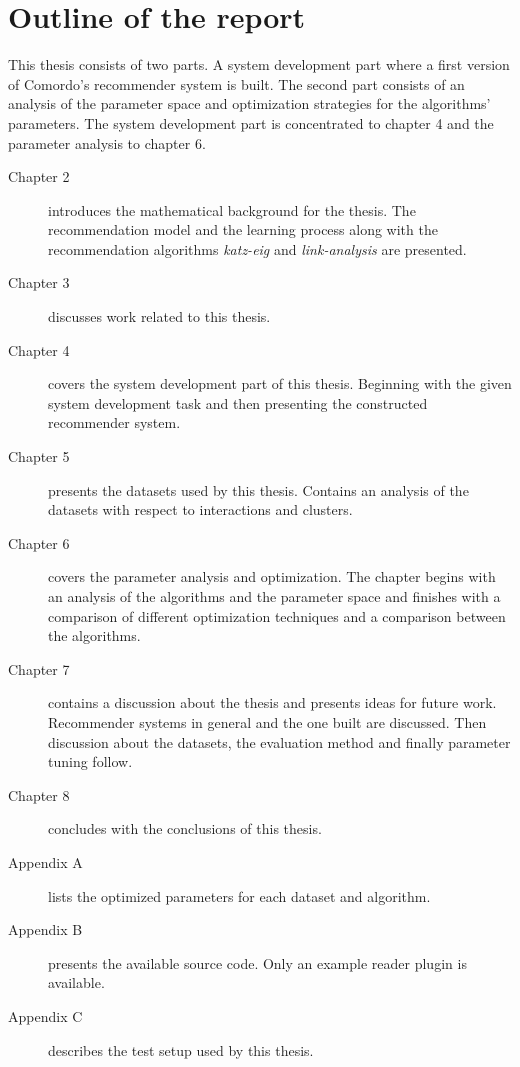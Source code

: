 
\section{Outline of the report}\label{sec:intro:outline}

This thesis consists of two parts. A system development part where a first version of Comordo's recommender system is built. The second part consists of an analysis of the parameter space and optimization strategies for the algorithms' parameters. The system development part is concentrated to chapter 4 and the parameter analysis to chapter 6.

\begin{description}
    \item[Chapter 2] introduces the mathematical background for the thesis. The recommendation model and the learning process along with the recommendation algorithms \textit{katz-eig} and \textit{link-analysis} are presented.
    \item[Chapter 3] discusses work related to this thesis.
    \item[Chapter 4] covers the system development part of this thesis. Beginning with the given system development task and then presenting the constructed recommender system.
    \item[Chapter 5] presents the datasets used by this thesis. Contains an analysis of the datasets with respect to interactions and clusters.
    \item[Chapter 6] covers the parameter analysis and optimization. The chapter begins with an analysis of the algorithms and the parameter space and finishes with a comparison of different optimization techniques and a comparison between the algorithms.
    \item[Chapter 7] contains a discussion about the thesis and presents ideas for future work. Recommender systems in general and the one built are discussed. Then discussion about the datasets, the evaluation method and finally parameter tuning follow.
    \item[Chapter 8] concludes with the conclusions of this thesis.
    \item[Appendix A] lists the optimized parameters for each dataset and algorithm.
    \item[Appendix B] presents the available source code. Only an example reader plugin is available.
    \item[Appendix C] describes the test setup used by this thesis.
\end{description}

